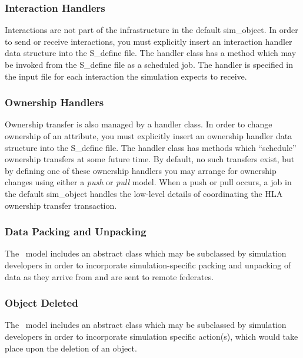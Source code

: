 \subsubsection{Interaction Handlers}

Interactions are not part of the infrastructure in the default {\ttfamily sim\_object}.
In order to send or receive interactions, you must explicitly
insert an interaction handler data structure into the {\ttfamily S\_define} file.
The handler class has a method which may be invoked from the {\ttfamily S\_define} file as a
scheduled job.
The handler is specified in the input file for each interaction the simulation expects
to receive.

\subsubsection{Ownership Handlers}

Ownership transfer is also managed by a handler class.
In order to change ownership of an attribute,
you must explicitly insert an ownership handler data structure into the 
{\ttfamily S\_define} file.
The handler class has methods which ``schedule'' ownership transfers at some future
time. 
By default, no such transfers exist, but by defining one of these ownership handlers
you may arrange for ownership changes using either a {\em push} or {\em pull} model. 
When a push or pull occurs, a job in the default {\ttfamily sim\_object} handles
the low-level details of coordinating the HLA ownership transfer transaction.

\subsubsection{Data Packing and Unpacking}

The \TrickHLA\ model includes an abstract class which may be subclassed by 
simulation developers in order to incorporate simulation-specific packing and unpacking
of data as they arrive from and are sent to remote federates.

\subsubsection{Object Deleted}

The \TrickHLA\ model includes an abstract class which may be subclassed by 
simulation developers in order to incorporate simulation specific action(s), 
which would take place upon the deletion of an object.

